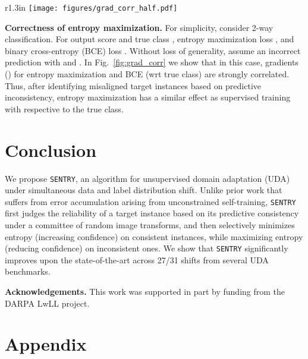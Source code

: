 \documentclass[10pt,twocolumn,letterpaper]{article}
\newcommand{\method}{\texttt{SENTRY}\xspace}
\begin{document}
\begin{wrapfigure}{r}{1.3in}
    \vspace{-\intextsep}
    \texttt{[image: figures/grad\_corr\_half.pdf]}
    \caption{ v/s p}\vspace{-10pt}
    \label{fig:grad_corr}
  \end{wrapfigure}
\par\noindent \textbf{Correctness of entropy maximization.} 
For simplicity, consider 2-way classification. For output score  and true class , entropy maximization loss , and binary cross-entropy (BCE) loss . Without loss of generality, assume an incorrect prediction with  and . In Fig.~\ref{fig:grad_corr} we show that in this case, gradients () for entropy maximization and BCE (wrt true class) are strongly correlated. Thus, after identifying misaligned target instances based on predictive inconsistency, entropy maximization has a similar effect as supervised training with respective to the true class.

 \vspace{-7pt}
\section{Conclusion}
\vspace{-5pt}

\noindent We propose \method, an algorithm for unsupervised domain adaptation (UDA) under simultaneous data and label distribution shift. Unlike prior work that suffers from error accumulation arising from unconstrained self-training, \method first judges the reliability of a target instance based on its predictive consistency under a committee of random image transforms, and then selectively minimizes entropy (increasing confidence) on consistent instances, while maximizing entropy (reducing confidence) on inconsistent ones. We show that \method significantly improves upon the state-of-the-art across 27/31 shifts from several UDA benchmarks.

\noindent\textbf{Acknowledgements.} This work was
supported in part by funding from the DARPA LwLL project. 

{\small


}

\section{Appendix}
\localtableofcontents

\newcommand\DoToC{\startcontents
  \printcontents{}{2}{\textbf{Contents}\vskip3pt\hrule\vskip5pt}
  \vskip3pt\hrule\vskip5pt
}
\end{document}
